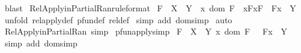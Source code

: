 \begin{isabellebody}
\isamarkupfalse%
\ blast\isanewline
{}\isamarkupfalse%
%
\endisatagproof
{\isafoldproof}%
%
\isadelimproof
\isanewline
%
\endisadelimproof
\isanewline
{}\isamarkupfalse%
\ Rel{\isacharunderscore}Apply{\isacharunderscore}in{\isacharunderscore}Partial{\isacharunderscore}Ran{\isacharbrackleft}rule{\isacharunderscore}format{\isacharbrackright}{\isacharcolon}\ \isanewline
{\isachardoublequoteopen}{\isacharparenleft}F\ {\isacharcolon}\ {\isacharparenleft}X\ {\isacharminus}{\isacharbar}{\isacharminus}{\isachargreater}\ Y{\isacharparenright}{\isacharparenright}\ {\isacharminus}{\isacharminus}{\isachargreater}\ {\isacharparenleft}x{\isacharcolon}\ dom\ F{\isacharparenright}\ {\isacharminus}{\isacharminus}{\isachargreater}\ {\isacharparenleft}x{\isacharcomma}F{\isacharpercent}{\isacharcircum}x{\isacharparenright}{\isacharcolon}F\ {\isacharminus}{\isacharminus}{\isachargreater}\ {\isacharparenleft}{\isacharparenleft}F{\isacharpercent}{\isacharcircum}x{\isacharparenright}\ {\isacharcolon}\ Y{\isacharparenright}{\isachardoublequoteclose}\isanewline
%
\isadelimproof
%
\endisadelimproof
%
\isatagproof
{}\isamarkupfalse%
\ {\isacharparenleft}unfold\ rel{\isacharunderscore}apply{\isacharunderscore}def\ pfun{\isacharunderscore}def\ rel{\isacharunderscore}def{\isacharparenright}\isanewline
{}\isamarkupfalse%
\ {\isacharparenleft}simp\ add{\isacharcolon}\ dom{\isacharunderscore}simp{\isacharparenright}\isanewline
{}\isamarkupfalse%
\ auto\isanewline
{}\isamarkupfalse%
%
\endisatagproof
{\isafoldproof}%
%
\isadelimproof
\isanewline
%
\endisadelimproof
\isanewline
{}\isamarkupfalse%
\ Rel{\isacharunderscore}Apply{\isacharunderscore}in{\isacharunderscore}Partial{\isacharunderscore}Ran\ {\isacharbrackleft}simp{\isacharbrackright}\isanewline
\isanewline
{}\isamarkupfalse%
\ pfun{\isacharunderscore}apply{\isacharbrackleft}simp{\isacharbrackright}{\isacharcolon}\ \isanewline
{\isachardoublequoteopen}{\isacharbrackleft}{\isacharbar}F\ {\isacharcolon}\ {\isacharparenleft}X\ {\isacharminus}{\isacharbar}{\isacharminus}{\isachargreater}\ Y{\isacharparenright}{\isacharsemicolon}\ x{\isacharcolon}\ dom\ F\ {\isacharbar}{\isacharbrackright}\ {\isacharequal}{\isacharequal}{\isachargreater}\ {\isacharparenleft}F{\isacharpercent}{\isacharcircum}x{\isacharparenright}\ {\isacharcolon}\ Y{\isachardoublequoteclose}\isanewline
%
\isadelimproof
%
\endisadelimproof
%
\isatagproof
{}\isamarkupfalse%
\ {\isacharparenleft}simp\ add{\isacharcolon}\ dom{\isacharunderscore}simp{\isacharparenright}\isanewline

\end{isabellebody}
